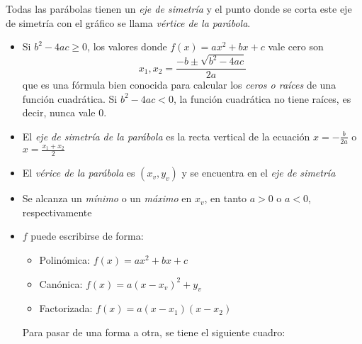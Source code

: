 \documentclass[../Teoría.root.tex]{subfiles}
\begin{document}
Todas las parábolas tienen un \textit{eje de simetría} y el punto donde se corta este eje de simetría con el gráfico se llama \textit{vértice de la parábola}.
\begin{itemize}
    \item Si \(b^2 − 4ac \geq 0\), los valores donde \(f(x) = ax^2 + bx + c\) vale cero son \[x_1,x_2=\frac{-b\pm\sqrt{b^2-4ac}}{2a}\] que es una fórmula bien conocida para calcular los \textit{ceros o raíces} de una función cuadrática.
          Si \(b^2 − 4ac < 0\), la función cuadrática no tiene raíces, es decir, nunca vale 0.
    \item El \textit{eje de simetría de la parábola} es la recta vertical de la ecuación \(x=-\frac{b}{2a}\) o \(x=\frac{x_1+x_2}{2}\)
    \item El \textit{vérice de la parábola} es \((x_v,y_v)\) y se encuentra en el \textit{eje de simetría}
    \item Se alcanza un \textit{mínimo} o un \textit{máximo} en \(x_v\), en tanto \(a>0\) o \(a<0\), respectivamente
    \item \(f\) puede escribirse de forma:
          \begin{itemize}
              \item Polinómica:
                    \(f(x)=ax^2+bx+c\)
              \item Canónica:
                    \(f(x)=a(x-x_v)^2+y_v\)
              \item Factorizada:
                    \(f(x)=a(x-x_1)(x-x_2)\)
          \end{itemize}
          Para pasar de una forma a otra, se tiene el siguiente cuadro:
          \begin{center}
              \begin{scaletikzpicturetowidth}{\linewidth}
              \end{scaletikzpicturetowidth}
          \end{center}
\end{itemize}
\end{document}
